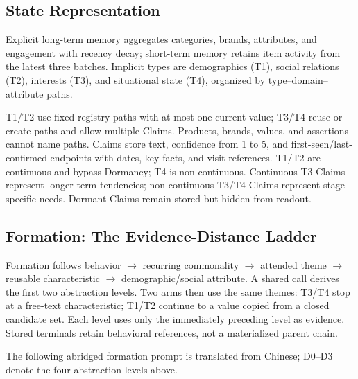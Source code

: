 \documentclass[sigconf,nonacm,balance=false]{acmart}
\begin{document}
\subsection{State Representation}
\label{app:method-state}
Explicit long-term memory aggregates categories, brands, attributes, and engagement with recency decay; short-term memory retains item activity from the latest three batches. Implicit types are demographics (T1), social relations (T2), interests (T3), and situational state (T4), organized by type--domain--attribute paths.

T1/T2 use fixed registry paths with at most one current value; T3/T4 reuse or create paths and allow multiple Claims. Products, brands, values, and assertions cannot name paths. Claims store text, confidence from 1 to 5, and first-seen/last-confirmed endpoints with dates, key facts, and visit references. T1/T2 are continuous and bypass Dormancy; T4 is non-continuous. Continuous T3 Claims represent longer-term tendencies; non-continuous T3/T4 Claims represent stage-specific needs. Dormant Claims remain stored but hidden from readout.

\subsection{Formation: The Evidence-Distance Ladder}
\label{app:method-formation}
Formation follows behavior $\rightarrow$ recurring commonality $\rightarrow$ attended theme $\rightarrow$ reusable characteristic $\rightarrow$ demographic/social attribute. A shared call derives the first two abstraction levels. Two arms then use the same themes: T3/T4 stop at a free-text characteristic; T1/T2 continue to a value copied from a closed candidate set. Each level uses only the immediately preceding level as evidence. Stored terminals retain behavioral references, not a materialized parent chain.

The following abridged formation prompt is translated from Chinese; D0--D3 denote the four abstraction levels above.
\end{document}
